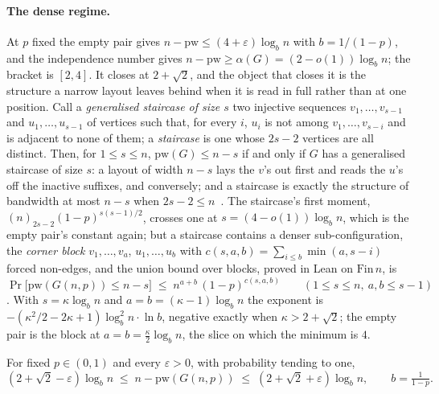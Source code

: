 \paragraph{The dense regime.}
At $p$ fixed the empty pair gives $n-\mathrm{pw}\le(4+\varepsilon)\log_{b}n$
with $b=1/(1-p)$, and the independence number gives
$n-\mathrm{pw}\ge\alpha(G)=(2-o(1))\log_{b}n$; the bracket is $[2,4]$. It
closes at $2+\sqrt2$, and the object that closes it is the structure a narrow
layout leaves behind when it is read in full rather than at one position.
Call a \emph{generalised staircase of size $s$} two injective sequences
$v_{1},\dots,v_{s-1}$ and $u_{1},\dots,u_{s-1}$ of vertices such that, for
every $i$, $u_{i}$ is not among $v_{1},\dots,v_{s-i}$ and is adjacent to none
of them; a \emph{staircase} is one whose $2s-2$ vertices are all distinct.
Then, for $1\le s\le n$, $\mathrm{pw}(G)\le n-s$ if and only if $G$ has a
generalised staircase of size $s$: a layout of width $n-s$ lays the $v$'s out
first and reads the $u$'s off the inactive suffixes, and conversely; and a
staircase is exactly the structure of bandwidth at most $n-s$ when
$2s-2\le n$~. The staircase's first moment,
$(n)_{2s-2}(1-p)^{s(s-1)/2}$, crosses one at $s=(4-o(1))\log_{b}n$, which is
the empty pair's constant again; but a staircase contains a denser
sub-configuration, the \emph{corner block} $v_{1},\dots,v_{a}$,
$u_{1},\dots,u_{b}$ with $c(s,a,b)=\sum_{i\le b}\min(a,s-i)$ forced
non-edges, and the union bound over blocks, proved in Lean on $\mathrm{Fin}\,n$,
is
\[
  \Pr\bigl[\mathrm{pw}(G(n,p))\le n-s\bigr]\;\le\;n^{a+b}\,(1-p)^{c(s,a,b)}
  \qquad(1\le s\le n,\ a,b\le s-1)
\]
. With $s=\kappa\log_{b}n$ and $a=b=(\kappa-1)\log_{b}n$
the exponent is $-(\kappa^{2}/2-2\kappa+1)\log_{b}^{2}n\cdot\ln b$, negative
exactly when $\kappa>2+\sqrt2$; the empty pair is the block at
$a=b=\tfrac{\kappa}{2}\log_{b}n$, the slice on which the minimum is $4$.

\begin{theorem}
\label{thm:dense}
For fixed $p\in(0,1)$ and every $\varepsilon>0$, with probability tending to
one,
\[
  (2+\sqrt2-\varepsilon)\log_{b}n\;\le\;n-\mathrm{pw}(G(n,p))\;\le\;(2+\sqrt2+\varepsilon)\log_{b}n,
  \qquad b=\tfrac1{1-p}.
\]
\end{theorem}

